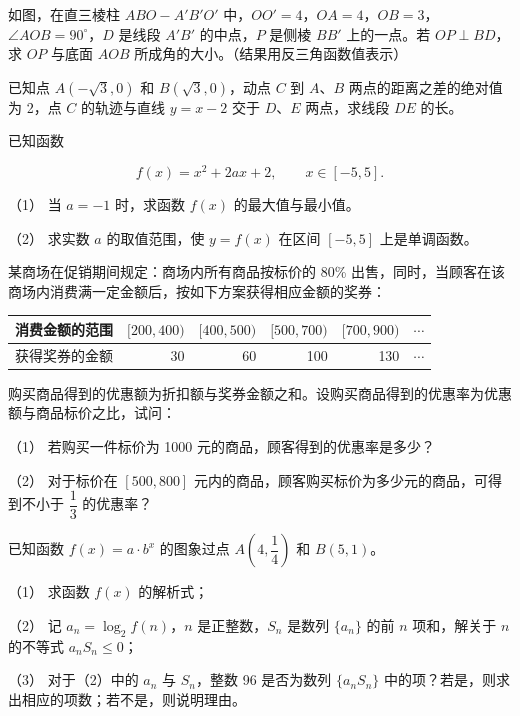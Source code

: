 \Needspace{0.4\textheight}
\begin{question}
如图，在直三棱柱 $ABO-A'B'O'$ 中，$OO'=4$，$OA=4$，$OB=3$，$\angle AOB=90^\circ$，$D$ 是线段 $A'B'$ 的中点，$P$ 是侧棱 $BB'$ 上的一点。若 $OP\perp BD$，求 $OP$ 与底面 $AOB$ 所成角的大小。（结果用反三角函数值表示）
\nopagebreak[4]
\begin{center}\end{center}
\nopagebreak[4]
\end{question}
\begin{question}
已知点 $A(-\sqrt3,0)$ 和 $B(\sqrt3,0)$，动点 $C$ 到 $A\text{、}B$ 两点的距离之差的绝对值为 2，点 $C$ 的轨迹与直线 $y=x-2$ 交于 $D\text{、}E$ 两点，求线段 $DE$ 的长。

\end{question}
\begin{question}
已知函数

\nopagebreak[4]
\[
f(x)=x^2+2ax+2,\qquad x\in[-5,5].
\]

（1） 当 $a=-1$ 时，求函数 $f(x)$ 的最大值与最小值。

（2） 求实数 $a$ 的取值范围，使 $y=f(x)$ 在区间 $[-5,5]$ 上是单调函数。

\end{question}
\begin{question}
某商场在促销期间规定：商场内所有商品按标价的 80\% 出售，同时，当顾客在该商场内消费满一定金额后，按如下方案获得相应金额的奖券：

\begin{center}
\begin{tabular}{lrrrrr}
\toprule
消费金额的范围 & $[200,400)$ & $[400,500)$ & $[500,700)$ & $[700,900)$ & $\cdots$ \\
\midrule
获得奖券的金额 & 30 & 60 & 100 & 130 & $\cdots$ \\
\bottomrule
\end{tabular}
\end{center}

购买商品得到的优惠额为折扣额与奖券金额之和。设购买商品得到的优惠率为优惠额与商品标价之比，试问：

（1） 若购买一件标价为 1000 元的商品，顾客得到的优惠率是多少？

（2） 对于标价在 $[500,800]$ 元内的商品，顾客购买标价为多少元的商品，可得到不小于 $\dfrac13$ 的优惠率？

\end{question}
\begin{question}
已知函数 $f(x)=a\cdot b^x$ 的图象过点 $A(4,\dfrac14)$ 和 $B(5,1)$。

（1） 求函数 $f(x)$ 的解析式；

（2） 记 $a_n=\log_2f(n)$，$n$ 是正整数，$S_n$ 是数列 $\{a_n\}$ 的前 $n$ 项和，解关于 $n$ 的不等式 $a_nS_n\le0$；

（3） 对于（2）中的 $a_n$ 与 $S_n$，整数 96 是否为数列 $\{a_nS_n\}$ 中的项？若是，则求出相应的项数；若不是，则说明理由。

\end{question}
